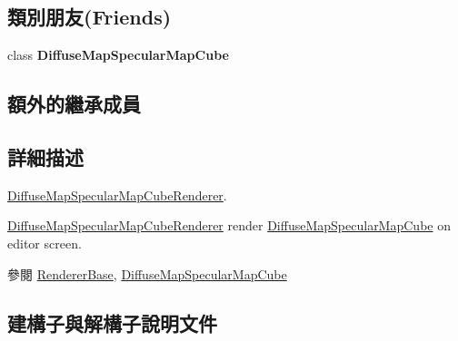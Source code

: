 \subsection*{類別朋友(Friends)}
\begin{DoxyCompactItemize}
\item 
class {\bfseries Diffuse\+Map\+Specular\+Map\+Cube}\hypertarget{class_i_dream_sky_1_1_diffuse_map_specular_map_cube_renderer_aba62c454ef12905f7e760ee7c8129df9}{}\label{class_i_dream_sky_1_1_diffuse_map_specular_map_cube_renderer_aba62c454ef12905f7e760ee7c8129df9}

\end{DoxyCompactItemize}
\subsection*{額外的繼承成員}


\subsection{詳細描述}
\hyperlink{class_i_dream_sky_1_1_diffuse_map_specular_map_cube_renderer}{Diffuse\+Map\+Specular\+Map\+Cube\+Renderer}. 

\hyperlink{class_i_dream_sky_1_1_diffuse_map_specular_map_cube_renderer}{Diffuse\+Map\+Specular\+Map\+Cube\+Renderer} render \hyperlink{class_i_dream_sky_1_1_diffuse_map_specular_map_cube}{Diffuse\+Map\+Specular\+Map\+Cube} on editor screen. \begin{DoxySeeAlso}{參閱}
\hyperlink{class_i_dream_sky_1_1_renderer_base}{Renderer\+Base}, \hyperlink{class_i_dream_sky_1_1_diffuse_map_specular_map_cube}{Diffuse\+Map\+Specular\+Map\+Cube} 
\end{DoxySeeAlso}


\subsection{建構子與解構子說明文件}
